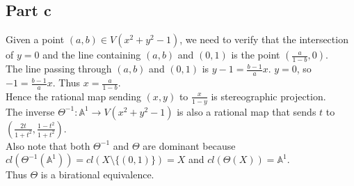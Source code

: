 \documentclass[12pt]{article}
\begin{document}
\begin{enumerate}
\subsection*{Part c}
Given a point $(a,b) \in V(x^2+y^2-1)$, we need to verify that the intersection of $y=0$ and the line containing $(a,b)$ and $(0,1)$ is the point $(\frac{a}{1-b},0)$. \\
The line passing through  $(a,b)$ and $(0,1)$
is $y-1=\frac{b-1}{a}x$. $y=0$, so
$-1=\frac{b-1}{a}x$. Thus $x=\frac{a}{1-b}$. \\
Hence the rational map sending $(x,y)$ to
$\frac{x}{1-y}$ is stereographic projection. \\
The inverse $\Theta^{-1} : \mathbb{A}^1 \rightarrow V(x^2+y^2-1)$ is also a rational map
that sends $t$ to $(\frac{2t}{1+t^2},\frac{1-t^2}{1+t^2})$. \\
Also note that both $\Theta^{-1}$ and $\Theta$ are dominant because\\ 
$cl(\Theta^{-1}(\mathbb{A}^1))=cl(X\setminus \{(0,1)\})=X$ and $cl(\Theta(X))=\mathbb{A}^1$.\\
Thus $\Theta$ is a birational equivalence.


\end{enumerate}
\end{document}
